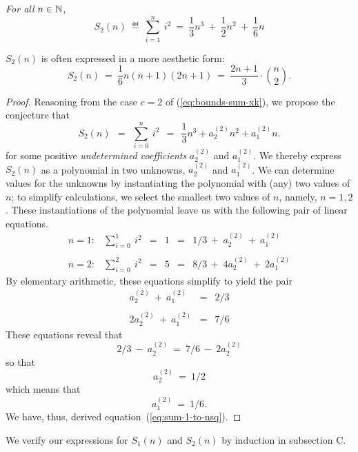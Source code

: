 \begin{prop}
{\em For all} $n \in \mathbb{N}$,
\begin{equation}
\label{eq:sum-1-to-nsq}
S_2(n) \ \eqdef \ \sum_{i=1}^n \ i^2 
 \ = \ \frac{1}{3} n^3 \ + \ \frac{1}{2} n^2 \ + \ \frac{1}{6} n
\end{equation}
\end{prop}

\noindent
$S_2(n)$ is often expressed in a more aesthetic form:
\[ S_2(n) \ = \
\frac{1}{6} n (n+1)(2n+1) \ = \
\frac{2n+1}{3} \cdot {n \choose 2}.
\]

\begin{proof}
Reasoning from the case $c=2$ of (\ref{eq:bounds-sum-xk}), we
propose the conjecture that
\begin{equation}
\label{eq:symbolic-cubic}
S_2(n) \ \ = \ \
\sum_{i=0}^n \ i^2 \ \ = \ \ \frac{1}{3} n^3 + a^{(2)}_2 n^2 + a^{(2)}_1 n.
\end{equation}
for some positive {\it undetermined coefficients} $a^{(2)}_2$ and
$a^{(2)}_1$.  We thereby express $S_2(n)$ as a polynomial in two
unknowns, $a^{(2)}_2$ and $a^{(2)}_1$.  We can determine values for
the unknowns by instantiating the polynomial with (any) two values of
$n$; to simplify calculations, we select the smallest two values of
$n$, namely, $n = 1,2$.  These instantiations of the polynomial leave
us with the following pair of linear equations.
\[
\begin{array}{cccccl}
n=1: & \sum_{i=0}^1 \ i^2
   & = & 1 & = &
1/3 \ + \ a^{(2)}_2 \ + \ a^{(2)}_1 \\
 & & & & & \\
n=2: & \sum_{i=0}^2 \ i^2
   & = & 5 & = &
8/3 \ + \ 4 a^{(2)}_2 \ + \ 2 a^{(2)}_1
\end{array}
\]
By elementary arithmetic, these equations simplify to yield the pair
\[
\begin{array}{ccc}
a^{(2)}_2 \ + \ a^{(2)}_1   & = & 2/3 \\
 & & \\
2 a^{(2)}_2 \ + \ a^{(2)}_1 & = & 7/6
\end{array}
\]
These equations reveal that
\[ 2/3 \ - \ a^{(2)}_2 \ = \ 7/6 \ - \ 2 a^{(2)}_2 \]
so that 
\[ a^{(2)}_2 \ = \ 1/2 \]
which means that
\[ a^{(2)}_1 \ = \ 1/6. \]
We have, thus, derived equation~(\ref{eq:sum-1-to-nsq}).  
\end{proof}

\medskip

We verify our expressions for $S_1(n)$ and $S_2(n)$ by induction in
subsection C.


